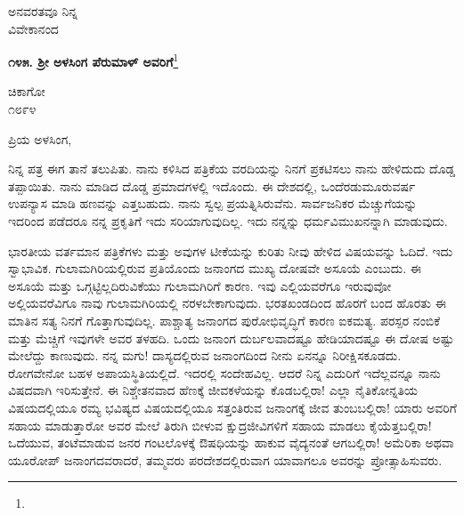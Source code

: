 \vspace{-0.5cm}

{\flushright
ಅನವರತವೂ ನಿನ್ನ\\ವಿವೇಕಾನಂದ\par}

\vspace{-0.5cm}

\begin{center}
\textbf{೧೪೫. ಶ‍್ರೀ ಅಳಸಿಂಗ ಪೆರುಮಾಳ್ ಅವರಿಗೆ}\footnote{}
\end{center}

\vspace{-0.5cm}

\begin{flushright}
ಚಿಕಾಗೋ\\೧೮೯೪
\end{flushright}

\vspace{-0.5cm}

\noindent
ಪ್ರಿಯ ಅಳಸಿಂಗ,

ನಿನ್ನ ಪತ್ರ ಈಗ ತಾನೆ ತಲುಪಿತು. ನಾನು ಕಳಿಸಿದ ಪತ್ರಿಕೆಯ ವರದಿಯನ್ನು ನಿನಗೆ ಪ್ರಕಟಿಸಲು ನಾನು ಹೇಳಿದುದು ದೊಡ್ಡ ತಪ್ಪಾಯಿತು. ನಾನು ಮಾಡಿದ ದೊಡ್ಡ ಪ್ರಮಾದಗಳಲ್ಲಿ ಇದೊಂದು. ಈ ದೇಶದಲ್ಲಿ, ಒಂದೆರಡು\enginline{-}ಮೂರುವರ್ಷ ಉಪನ್ಯಾಸ ಮಾಡಿ ಹಣವನ್ನು ಎತ್ತಬಹುದು. ನಾನು ಸ್ವಲ್ಪ ಪ್ರಯತ್ನಿಸಿರುವೆನು. ಸಾರ್ವಜನಿಕರ ಮೆಚ್ಚುಗೆಯನ್ನು ಇದರಿಂದ ಪಡೆದರೂ ನನ್ನ ಪ್ರಕೃತಿಗೆ ಇದು ಸರಿಯಾಗುವುದಿಲ್ಲ. ಇದು ನನ್ನನ್ನು ಧರ್ಮವಿಮುಖನನ್ನಾಗಿ ಮಾಡುವುದು.

ಭಾರತೀಯ ವರ್ತಮಾನ ಪತ್ರಿಕೆಗಳು ಮತ್ತು ಅವುಗಳ ಟೀಕೆಯನ್ನು ಕುರಿತು ನೀವು ಹೇಳಿದ ವಿಷಯವನ್ನು ಓದಿದೆ. ಇದು ಸ್ವಾಭಾವಿಕ. ಗುಲಾಮಗಿರಿಯಲ್ಲಿರುವ ಪ್ರತಿಯೊಂದು ಜನಾಂಗದ ಮುಖ್ಯ ದೋಷವೇ ಅಸೂಯೆ ಎಂಬುದು. ಈ ಅಸೂಯೆ ಮತ್ತು ಒಗ್ಗಟ್ಟಿಲ್ಲದಿರುವಿಕೆಯು ಗುಲಾಮಗಿರಿಗೆ ಕಾರಣ. ಇವು ಎಲ್ಲಿಯವರೆಗೂ ಇರುವುವೋ ಅಲ್ಲಿಯವರೆವಿಗೂ ನಾವು ಗುಲಾಮಗಿರಿಯಲ್ಲಿ ನರಳಬೇಕಾಗುವುದು. ಭರತಖಂಡದಿಂದ ಹೊರಗೆ ಬಂದ ಹೊರತು ಈ ಮಾತಿನ ಸತ್ಯ ನಿನಗೆ ಗೊತ್ತಾಗುವುದಿಲ್ಲ. ಪಾಶ್ಚಾತ್ಯ ಜನಾಂಗದ ಪುರೋಭಿವೃದ್ಧಿಗೆ ಕಾರಣ ಐಕಮತ್ಯ. ಪರಸ್ಪರ ನಂಬಿಕೆ ಮತ್ತು ಮೆಚ್ಚಿಗೆ ಇವುಗಳೇ ಅವರ ತಳಹದಿ. ಒಂದು ಜನಾಂಗ ದುರ್ಬಲವಾದಷ್ಟೂ ಹೇಡಿಯಾದಷ್ಟೂ ಈ ದೋಷ ಅಷ್ಟು ಮೇಲೆದ್ದು ಕಾಣುವುದು. ನನ್ನ ಮಗು! ದಾಸ್ಯದಲ್ಲಿರುವ ಜನಾಂಗದಿಂದ ನೀನು ಏನನ್ನೂ ನಿರೀಕ್ಷಿಸಕೂಡದು. ರೋಗವೇನೋ ಬಹಳ ಅಪಾಯಸ್ಥಿತಿಯಲ್ಲಿದೆ. ಇದರಲ್ಲಿ ಸಂದೇಹವಿಲ್ಲ. ಆದರೆ ನಿನ್ನ ಎದುರಿಗೆ ಇದೆಲ್ಲವನ್ನೂ ನಾನು ವಿಷದವಾಗಿ ಇರಿಸುತ್ತೇನೆ. ಈ ನಿಶ್ಚೇತನವಾದ ಹೆಣಕ್ಕೆ ಜೀವಕಳೆಯನ್ನು ಕೊಡಬಲ್ಲಿರಾ! ಎಲ್ಲಾ ನೈತಿಕೋನ್ನತಿಯ ವಿಷಯದಲ್ಲಿಯೂ ರಮ್ಯ ಭವಿಷ್ಯದ ವಿಷಯದಲ್ಲಿಯೂ ಸತ್ತಂತಿರುವ ಜನಾಂಗಕ್ಕೆ ಜೀವ ತುಂಬಬಲ್ಲಿರಾ! ಯಾರು ಅವರಿಗೆ ಸಹಾಯ ಮಾಡುತ್ತಾರೋ ಅವರ ಮೇಲೆ ತಿರುಗಿ ಬೀಳುವ ಕ್ಷುದ್ರಜೀವಿಗಳಿಗೆ ಸಹಾಯ ಮಾಡಲು ಕೈಯೆತ್ತಬಲ್ಲಿರಾ! ಒದೆಯುವ, ತಂಟೆಮಾಡುವ ಜನರ ಗಂಟಲೊಳಕ್ಕೆ ಔಷಧಿಯನ್ನು ಹಾಕುವ ವೈದ್ಯನಂತೆ ಆಗಬಲ್ಲಿರಾ! ಅಮೆರಿಕಾ ಅಥವಾ ಯೂರೋಪ್ ಜನಾಂಗದವರಾದರೆ, ತಮ್ಮವರು ಪರದೇಶದಲ್ಲಿರುವಾಗ ಯಾವಾಗಲೂ ಅವರನ್ನು ಪ್ರೋತ್ಸಾಹಿಸುವರು.

